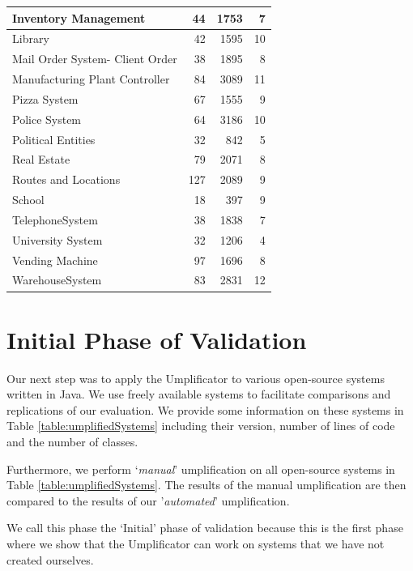 \begin{table}
\begin{tabular}{p{6cm}|rrr}
Inventory Management & 44 & 1753 & 7\\ \hline
Library & 42 & 1595 & 10\\ \hline
Mail Order System- Client Order & 38 & 1895 & 8\\ \hline
Manufacturing Plant Controller & 84 & 3089 & 11\\ \hline
Pizza System & 67 & 1555 & 9 \\ \hline
Police System & 64 & 3186 & 10\\ \hline
Political Entities & 32 & 842 & 5\\ \hline
Real Estate & 79 & 2071 & 8\\ \hline
Routes and Locations & 127 & 2089 & 9\\ \hline
School & 18 & 397 & 9\\ \hline
TelephoneSystem & 38 & 1838 & 7\\ \hline
University System & 32 & 1206 & 4\\ \hline
Vending Machine & 97 & 1696 & 8\\ \hline
WarehouseSystem & 83 & 2831 & 12\\ \hline
\bottomrule
\end{tabular}
\end{table}


\section{Initial Phase of Validation}

Our next step was to apply the Umplificator to various open-source systems written in Java. We use freely available systems to facilitate comparisons and replications of our evaluation. We provide some information on these systems in Table \ref{table:umplifiedSystems} including their version, number of lines of code and the number of classes.

Furthermore, we perform `\textit{manual}' umplification on all open-source systems in Table \ref{table:umplifiedSystems}. The results of the manual umplification are then compared to the results of our '\textit{automated}' umplification. 

We call this phase the `Initial' phase of validation because this is the first phase where we show that the Umplificator can work on systems that we have not created ourselves.

